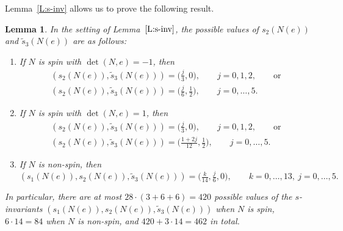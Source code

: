 \documentclass[10pt,a4paper]{amsart}
\numberwithin{equation}{section}
\newtheorem{Lemma}[Theorem]{Lemma}
\theoremstyle{definition}
\numberwithin{table}{section}
\begin{document}
Lemma~\ref{L:s-inv} allows us to prove the following result.
\begin{Lemma}\label{L:s_inv_nec}
	In the setting of Lemma~$\ref{L:s-inv}$, the possible values of $s_2(N(e))$ and $\tilde{s}_3(N(e))$ are as follows:
	\begin{enumerate}\itemsep=0pt
		\item If $N$ is spin with $\det(N,e)=-1$, then
		\begin{gather*}
         (s_2(N(e)),\tilde{s}_3(N(e)))=\bigl(\tfrac{j}{3},0\bigr),\qquad j=0,1,2,\qquad \text{or}\\
          (s_2(N(e)),\tilde{s}_3(N(e)))=\bigl(\tfrac{j}{6},\tfrac{1}{2}\bigr),\qquad j=0,\dots,5.
        \end{gather*}
		\item If $N$ is spin with $\det(N,e)=1$, then
		\begin{gather*}
         (s_2(N(e)),\tilde{s}_3(N(e)))=\bigl(\tfrac{j}{3},0\bigr), \qquad j=0,1,2,\qquad \text{or}\\
          (s_2(N(e)),\tilde{s}_3(N(e)))=\bigl(\tfrac{1+2j}{12},\tfrac{1}{2}\bigr),\qquad j=0,\dots,5.
         \end{gather*}
		\item If $N$ is non-spin, then
		\[(s_1(N(e)),s_2(N(e)),\tilde{s}_3(N(e)))=\bigl(\tfrac{k}{14},\tfrac{j}{6},0\bigr),\qquad k=0,\dots,13,\  j=0,\dots,5.\]
	\end{enumerate}
	In particular, there are at most $28\cdot (3+6+6)=420$ possible values of the $s$-invariants $(s_1(N(e)),s_2(N(e)),\tilde{s}_3(N(e)))$ when $N$ is spin, $6\cdot 14=84$ when $N$ is non-spin, and $420+3\cdot 14=462$ in total.
\end{Lemma}
\end{document}
